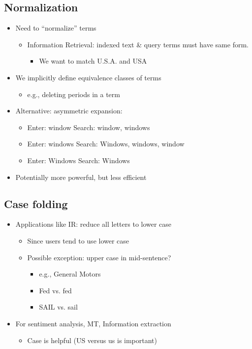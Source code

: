 \documentclass[11pt]{article}
\theoremstyle{definition}
\begin{document}
\subsection{Normalization}
\begin{itemize}
  \item Need to “normalize” terms
  \begin{itemize}
    \item Information Retrieval: indexed text \& query terms must have same form.
    \begin{itemize}
      \item We want to match U.S.A. and USA
    \end{itemize}
  \end{itemize}
  \item We implicitly define equivalence classes of terms
  \begin{itemize}
    \item e.g., deleting periods in a term
  \end{itemize}
  \item Alternative: asymmetric expansion:
  \begin{itemize}
    \item Enter: window Search: window, windows
    \item Enter: windows Search: Windows, windows, window
    \item Enter: Windows Search: Windows
  \end{itemize}
  \item Potentially more powerful, but less efficient
\end{itemize}

\subsection{Case folding}
\begin{itemize}
  \item Applications like IR: reduce all letters to lower case
  \begin{itemize}
    \item Since users tend to use lower case
    \item Possible exception: upper case in mid-sentence?
    \begin{itemize}
      \item e.g., General Motors
      \item Fed vs. fed
      \item SAIL vs. sail
    \end{itemize}
  \end{itemize}
  \item For sentiment analysis, MT, Information extraction
  \begin{itemize}
    \item Case is helpful (US versus us is important)
  \end{itemize}
\end{itemize}
\end{document}
